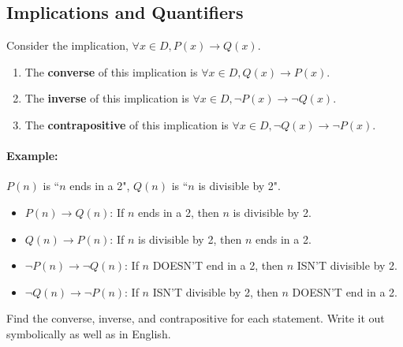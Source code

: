 {    \hrulefill

    \subsection{Implications and Quantifiers}

        \begin{introNOHEAD}
            Consider the implication, $\forall x \in D, P(x) \to Q(x)$.

            \begin{enumerate}
                \item The \textbf{converse} of this implication is $\forall x \in D, Q(x) \to P(x)$.
                \item The \textbf{inverse} of this implication is $\forall x \in D, \neg P(x) \to \neg Q(x)$.
                \item The \textbf{contrapositive} of this implication is $\forall x \in D, \neg Q(x) \to \neg P(x)$.
            \end{enumerate}

            \paragraph{Example:} $P(n)$ is ``$n$ ends in a 2", $Q(n)$ is ``$n$ is divisible by 2".

            \begin{itemize}
                \item   $P(n) \to Q(n)$: If $n$ ends in a 2, then $n$ is divisible by 2.
                \item   $Q(n) \to P(n)$: If $n$ is divisible by 2, then $n$ ends in a 2.
                \item   $\neg P(n) \to \neg Q(n)$: If $n$ DOESN'T end in a 2, then $n$ ISN'T divisible by 2.
                \item   $\neg Q(n) \to \neg P(n)$: If $n$ ISN'T divisible by 2, then $n$ DOESN'T end in a 2.
            \end{itemize}
        \end{introNOHEAD}

    \newpage

    \begin{questionNOGRADE}{\thequestion}
        Find the converse, inverse, and contrapositive for each statement.
        Write it out symbolically as well as in English.
        

\end{questionNOGRADE}}
